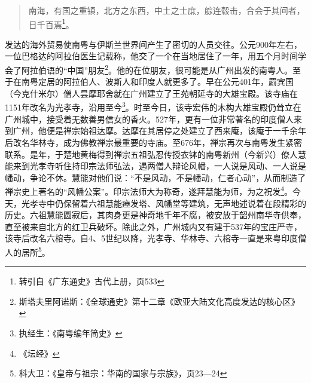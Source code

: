 \begin{quote}

南海，有国之重镇，北方之东西，中土之士庶，䑸连毂击，合会于其间者，日千百焉\footnote{转引自《广东通史》古代上册，页533}。

\end{quote}

发达的海外贸易使南粤与伊斯兰世界间产生了密切的人员交往。公元900年左右，一位巴格达的阿拉伯医生记载称，他交了一个在当地居住了一年，用五个月时间学会了阿拉伯语的“中国”朋友\footnote{斯塔夫里阿诺斯：《全球通史》第十二章《欧亚大陆文化高度发达的核心区》}。他的在位朋友，很可能是从广州出发的南粤人。至于在南粤定居的阿拉伯人、波斯人和印度人就更多了。早在公元401年，罽宾国（今克什米尔）僧人昙摩耶舍就在广州建立了王苑朝延寺的大雄宝殿。该寺庙在1151年改名为光孝寺，沿用至今\footnote{执经生：《南粤编年简史》}。时至今日，该寺宏伟的木构大雄宝殿仍耸立在广州城中，接受着无数善男信女的香火。527年，更有一位非常著名的印度僧人来到广州，他便是禅宗始祖达摩。达摩在其居停之处建立了西来庵，该庵于一千余年后改名华林寺，成为佛教禅宗最重要的寺庙。至676年，禅宗再次与南粤发生紧密联系。是年，于楚地黄梅得到禅宗五祖弘忍传授衣钵的南粤新州（今新兴）僚人慧能来到光孝寺听住持印宗法师弘法，遇两僧人辩论风幡，一人说是风动、一人说是幡动，争论不休。慧能对他们说：“不是风动，不是幡动，仁者心动”，从而制造了禅宗史上著名的“风幡公案”。印宗法师大为称奇，遂拜慧能为师，为之祝发\footnote{《坛经》}。今天，光孝寺中仍保留着六祖慧能瘗发塔、风幡堂等建筑，无声地述说着在段精彩的历史。六祖慧能圆寂后，其肉身更是神奇地千年不腐，被安放于韶州南华寺供奉，直至被来自北方的红卫兵破坏。除此之外，广州城内又有建于537年的宝庄严寺，该寺后改名六榕寺。自4、5世纪以降，光孝寺、华林寺、六榕寺一直是来粤印度僧人的居所\footnote{科大卫：《皇帝与祖宗：华南的国家与宗族》，页23—24}。

